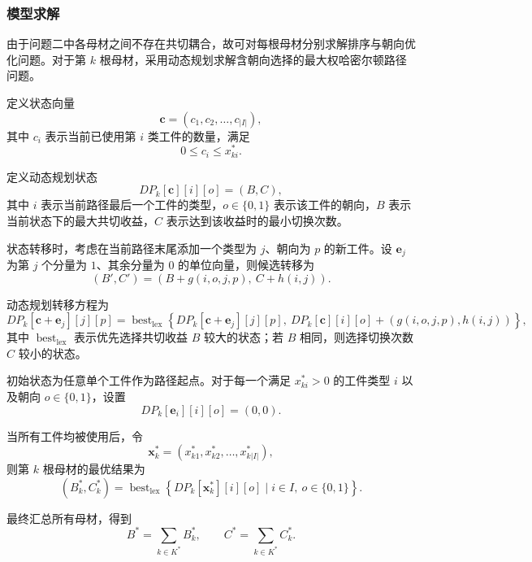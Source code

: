 \documentclass[UTF8]{ctexart}
\begin{document}
\subsubsection{模型求解}

由于问题二中各母材之间不存在共切耦合，故可对每根母材分别求解排序与朝向优化问题。对于第 $k$ 根母材，采用动态规划求解含朝向选择的最大权哈密尔顿路径问题。

定义状态向量
\[
\mathbf{c}=(c_1,c_2,\ldots,c_{|I|}),
\]
其中 $c_i$ 表示当前已使用第 $i$ 类工件的数量，满足
\[
0\leq c_i\leq x_{ki}^*.
\]

定义动态规划状态
\[
DP_k[\mathbf{c}][i][o]=(B,C),
\]
其中 $i$ 表示当前路径最后一个工件的类型，$o\in\{0,1\}$ 表示该工件的朝向，$B$ 表示当前状态下的最大共切收益，$C$ 表示达到该收益时的最小切换次数。

状态转移时，考虑在当前路径末尾添加一个类型为 $j$、朝向为 $p$ 的新工件。设 $\mathbf{e}_j$ 为第 $j$ 个分量为 $1$、其余分量为 $0$ 的单位向量，则候选转移为
\begin{equation}
(B',C')=\left(B+g(i,o,j,p),\ C+h(i,j)\right).
\label{eq:p2_candidate}
\end{equation}

动态规划转移方程为
\begin{equation}
DP_k[\mathbf{c}+\mathbf{e}_j][j][p]
=
\operatorname{best}_{\mathrm{lex}}
\left\{
DP_k[\mathbf{c}+\mathbf{e}_j][j][p],\
DP_k[\mathbf{c}][i][o]+\left(g(i,o,j,p),h(i,j)\right)
\right\},
\label{eq:p2_dp_transfer}
\end{equation}
其中 $\operatorname{best}_{\mathrm{lex}}$ 表示优先选择共切收益 $B$ 较大的状态；若 $B$ 相同，则选择切换次数 $C$ 较小的状态。

初始状态为任意单个工件作为路径起点。对于每一个满足 $x_{ki}^*>0$ 的工件类型 $i$ 以及朝向 $o\in\{0,1\}$，设置
\begin{equation}
DP_k[\mathbf{e}_i][i][o]=(0,0).
\label{eq:p2_dp_init}
\end{equation}

当所有工件均被使用后，令
\[
\mathbf{x}_k^*=(x_{k1}^*,x_{k2}^*,\ldots,x_{k|I|}^*),
\]
则第 $k$ 根母材的最优结果为
\begin{equation}
(B_k^*,C_k^*)=
\operatorname{best}_{\mathrm{lex}}
\left\{
DP_k[\mathbf{x}_k^*][i][o]\mid i\in I,\ o\in\{0,1\}
\right\}.
\label{eq:p2_dp_final}
\end{equation}

最终汇总所有母材，得到
\begin{equation}
B^*=\sum_{k\in K^*}B_k^*,\qquad
C^*=\sum_{k\in K^*}C_k^*.
\label{eq:p2_total_result}
\end{equation}
\end{document}
